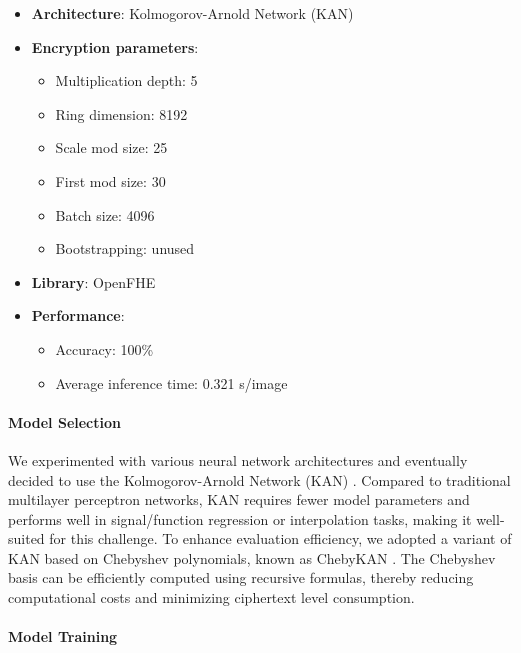 \documentclass[article]{iacrtrans}
\begin{document}
\begin{itemize}
    \item \textbf{Architecture}: Kolmogorov-Arnold Network (KAN)
    \item \textbf{Encryption parameters}: 
        \begin{itemize}
            \item Multiplication depth: 5
            \item Ring dimension: 8192
            \item Scale mod size: 25
            \item First mod size: 30
            \item Batch size: 4096
            \item Bootstrapping: unused
        \end{itemize}
    \item \textbf{Library}: OpenFHE \cite{OpenFHE}
    \item \textbf{Performance}: 
        \begin{itemize}
            \item Accuracy: 100\%
            \item Average inference time: 0.321 s/image
        \end{itemize}
\end{itemize}

\paragraph{Model Selection}\mbox{}

We experimented with various neural network architectures and eventually decided to use the Kolmogorov-Arnold Network (KAN) \cite{liu2025kankolmogorovarnoldnetworks}. Compared to traditional multilayer perceptron networks, KAN requires fewer model parameters and performs well in signal/function regression or interpolation tasks, making it well-suited for this challenge. To enhance evaluation efficiency, we adopted a variant of KAN based on Chebyshev polynomials, known as ChebyKAN \cite{ChebyKAN}. The Chebyshev basis can be efficiently computed using recursive formulas, thereby reducing computational costs and minimizing ciphertext level consumption.

\paragraph{Model Training}\mbox{}
\end{document}
